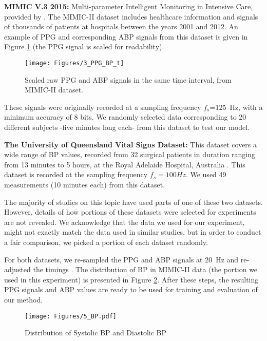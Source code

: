 \documentclass[letterpaper, 10 pt, conference]{ieeeconf}
\begin{document}
\textbf{MIMIC V.3 2015:} Multi-parameter Intelligent Monitoring in Intensive Care, provided by \cite{doi:10.1161/01.CIR.101.23.e215}. The MIMIC-II dataset includes healthcare information and signals of thousands of patients at hospitals between the years 2001 and 2012. 
An example of PPG and corresponding ABP signals from this dataset is given in Figure \ref{fig:PPG_BP_t} (the PPG signal is scaled for readability). 
\begin{figure}[bt]
    \centering
    \texttt{[image: Figures/3\_PPG\_BP\_t]}
    \caption{Scaled raw PPG and ABP signals in the same time interval, from MIMIC-II dataset.}
    \label{fig:PPG_BP_t}
    \vspace{-4ex}
\end{figure}
These signals were originally recorded at a sampling frequency $f_s$=125~Hz, with a minimum accuracy of 8 bits. We randomly selected data corresponding to 20 different subjects -five minutes long each- from this dataset to test our model.

\textbf{The University of Queensland Vital Signs Dataset:} This dataset covers a wide range of BP values, recorded from 32 surgical patients in duration ranging from 13 minutes to 5 hours, at the Royal Adelaide Hospital, Australia \cite{liu2012university}. This dataset is recorded at the sampling frequency $f_s=100 Hz$. We used 49 measurements (10 minutes each) from this dataset.

The majority of studies on this topic have used parts of one of these two datasets. However, details of how portions of these datasets were selected for experiments are not revealed. We acknowledge that the data we used for our experiment, might not exactly match the data used in similar studies, but in order to conduct a fair comparison, we picked a portion of each dataset randomly.

For both datasets, we re-sampled the PPG and ABP signals at 20~Hz and re-adjusted the timings \cite{xing2016optical}. 
The distribution of BP in MIMIC-II data (the portion we used in this experiment) is presented in Figure \ref{fig: Hist_BP}. After these steps, the resulting PPG signals and ABP values are ready to be used for training and evaluation of our method. 

\begin{figure}[bp]
    \centering
    \vspace{-2ex}
    \texttt{[image: Figures/5\_BP.pdf]}
    \caption{Distribution of Systolic BP and Diastolic BP}
        \label{fig: Hist_BP}
\end{figure}
\end{document}
